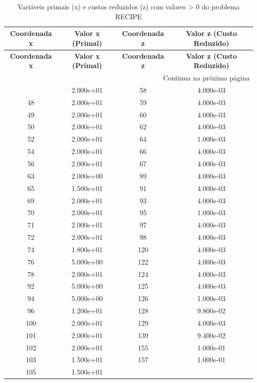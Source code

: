 \documentclass[12pt]{article}
\begin{document}
\begin{longtable}{@{}cccc@{}}
\caption{Variáveis primais (x) e custos reduzidos (z) com valores > 0 do problema RECIPE} \\
\toprule
\textbf{Coordenada x} & \textbf{Valor x (Primal)} & \textbf{Coordenada z} & \textbf{Valor z (Custo Reduzido)} \\
\midrule
\endfirsthead

\toprule
\textbf{Coordenada x} & \textbf{Valor x (Primal)} & \textbf{Coordenada z} & \textbf{Valor z (Custo Reduzido)} \\
\midrule
\endhead

\midrule \multicolumn{4}{r}{{Continua na próxima página}} \\ \midrule
\endfoot

\bottomrule
\endlastfoot
47 & 2.000e+01 & 58 & 4.000e-03 \\
48 & 2.000e+01 & 59 & 4.000e-03 \\
49 & 2.000e+01 & 60 & 4.000e-03 \\
50 & 2.000e+01 & 62 & 4.000e-03 \\
52 & 2.000e+01 & 64 & 1.000e-03 \\
54 & 2.000e+01 & 66 & 4.000e-03 \\
56 & 2.000e+01 & 67 & 4.000e-03 \\
63 & 2.000e+00 & 89 & 4.000e-03 \\
65 & 1.500e+01 & 91 & 4.000e-03 \\
69 & 2.000e+01 & 93 & 4.000e-03 \\
70 & 2.000e+01 & 95 & 1.000e-03 \\
71 & 2.000e+01 & 97 & 4.000e-03 \\
72 & 2.000e+01 & 98 & 4.000e-03 \\
74 & 1.800e+01 & 120 & 4.000e-03 \\
76 & 5.000e+00 & 122 & 4.000e-03 \\
78 & 2.000e+01 & 124 & 4.000e-03 \\
92 & 5.000e+00 & 125 & 4.000e-03 \\
94 & 5.000e+00 & 126 & 1.000e-03 \\
96 & 1.200e+01 & 128 & 9.800e-02 \\
100 & 2.000e+01 & 129 & 4.000e-03 \\
101 & 2.000e+01 & 139 & 9.400e-02 \\
102 & 2.000e+01 & 155 & 1.000e-01 \\
103 & 1.500e+01 & 157 & 1.000e-01 \\
105 & 1.500e+01 &  &  \\

\end{longtable}
\end{document}
